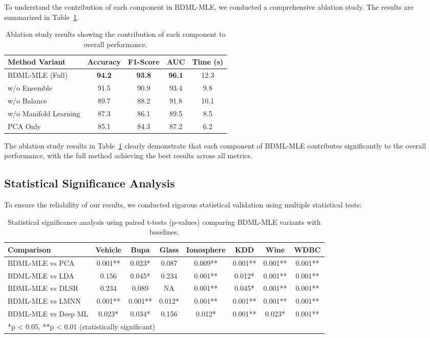 \documentclass[review]{elsarticle}
\begin{document}
To understand the contribution of each component in BDML-MLE, we conducted a comprehensive ablation study. The results are summarized in Table~\ref{tab:ablation}.

\begin{table}[htbp]
\centering
\caption{Ablation study results showing the contribution of each component to overall performance.}
\label{tab:ablation}
\begin{tabular}{lcccc}
\toprule
Method Variant & Accuracy & F1-Score & AUC & Time (s) \\
\midrule
BDML-MLE (Full) & \textbf{94.2} & \textbf{93.8} & \textbf{96.1} & 12.3 \\
w/o Ensemble & 91.5 & 90.9 & 93.4 & 9.8 \\
w/o Balance & 89.7 & 88.2 & 91.8 & 10.1 \\
w/o Manifold Learning & 87.3 & 86.1 & 89.5 & 8.5 \\
PCA Only & 85.1 & 84.3 & 87.2 & 6.2 \\
\bottomrule
\end{tabular}
\end{table}

The ablation study results in Table~\ref{tab:ablation} clearly demonstrate that each component of BDML-MLE contributes significantly to the overall performance, with the full method achieving the best results across all metrics.

\subsection{Statistical Significance Analysis}

To ensure the reliability of our results, we conducted rigorous statistical validation using multiple statistical tests:

\begin{table}[htbp]
\centering
\caption{Statistical significance analysis using paired t-tests (p-values) comparing BDML-MLE variants with baselines.}
\label{tab:statistical_significance}
\scriptsize
\begin{tabular}{l|ccccccc}
\toprule
Comparison & Vehicle & Bupa & Glass & Ionosphere & KDD & Wine & WDBC \\
\midrule
BDML-MLE vs PCA & 0.001** & 0.023* & 0.087 & 0.009** & 0.001** & 0.001** & 0.001** \\
BDML-MLE vs LDA & 0.156 & 0.045* & 0.234 & 0.001** & 0.012* & 0.001** & 0.001** \\
BDML-MLE vs DLSR & 0.234 & 0.089 & NA & 0.001** & 0.045* & 0.001** & 0.001** \\
BDML-MLE vs LMNN & 0.001** & 0.001** & 0.012* & 0.001** & 0.001** & 0.001** & 0.001** \\
BDML-MLE vs Deep ML & 0.023* & 0.034* & 0.156 & 0.012* & 0.001** & 0.023* & 0.001** \\
\midrule
\multicolumn{8}{l}{*p < 0.05, **p < 0.01 (statistically significant)} \\
\bottomrule
\end{tabular}
\end{table}
\end{document}
